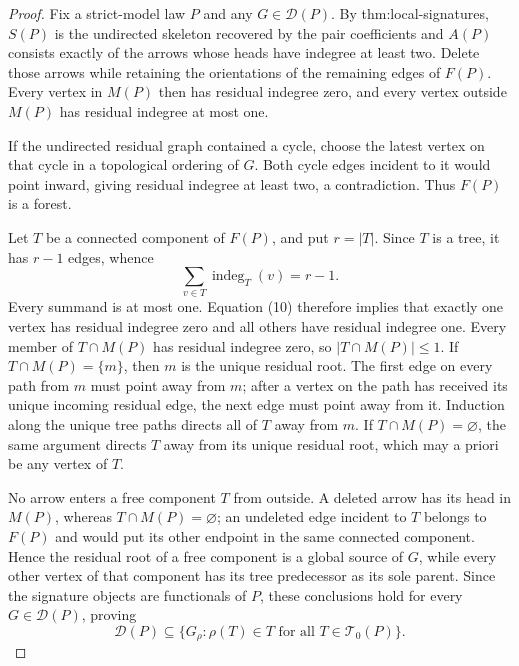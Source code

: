 \documentclass{article}
\begin{document}
\begin{proof}
Fix a strict-model law \(P\) and any \(G\in\mathcal D(P)\).  By thm:local-signatures, \(S(P)\) is the undirected skeleton recovered by the pair coefficients and \(A(P)\) consists exactly of the arrows whose heads have indegree at least two.  Delete those arrows while retaining the orientations of the remaining edges of \(F(P)\).  Every vertex in \(M(P)\) then has residual indegree zero, and every vertex outside \(M(P)\) has residual indegree at most one.

If the undirected residual graph contained a cycle, choose the latest vertex on that cycle in a topological ordering of \(G\).  Both cycle edges incident to it would point inward, giving residual indegree at least two, a contradiction.  Thus \(F(P)\) is a forest.

Let \(T\) be a connected component of \(F(P)\), and put \(r=|T|\).  Since \(T\) is a tree, it has \(r-1\) edges, whence
\[
 \sum_{v\in T}\operatorname{indeg}_T(v)=r-1.
\tag{10}
\]
Every summand is at most one.  Equation (10) therefore implies that exactly one vertex has residual indegree zero and all others have residual indegree one.  Every member of \(T\cap M(P)\) has residual indegree zero, so \(|T\cap M(P)|\le1\).  If \(T\cap M(P)=\{m\}\), then \(m\) is the unique residual root.  The first edge on every path from \(m\) must point away from \(m\); after a vertex on the path has received its unique incoming residual edge, the next edge must point away from it.  Induction along the unique tree paths directs all of \(T\) away from \(m\).  If \(T\cap M(P)=\varnothing\), the same argument directs \(T\) away from its unique residual root, which may a priori be any vertex of \(T\).

No arrow enters a free component \(T\) from outside.  A deleted arrow has its head in \(M(P)\), whereas \(T\cap M(P)=\varnothing\); an undeleted edge incident to \(T\) belongs to \(F(P)\) and would put its other endpoint in the same connected component.  Hence the residual root of a free component is a global source of \(G\), while every other vertex of that component has its tree predecessor as its sole parent.  Since the signature objects are functionals of \(P\), these conclusions hold for every \(G\in\mathcal D(P)\), proving
\[
 \mathcal D(P)\subseteq
 \{G_\rho:\rho(T)\in T\text{ for all }T\in\mathcal T_0(P)\}.
\tag{11}
\]


\end{proof}
\end{document}
